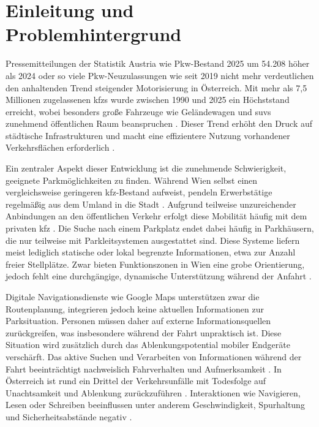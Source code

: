 \section{Einleitung und Problemhintergrund}

Pressemitteilungen der Statistik Austria wie \glqq Pkw-Bestand 2025 um 54.208 höher als 2024\grqq{} \parencite[S. 1]{statistikaustriaPkwBestand2025Um2026} oder  so viele Pkw-Neuzulassungen wie seit 2019 nicht mehr\grqq{} \parencite[S. 1]{statistikaustria2025VielePkwNeuzulassungen2026} verdeutlichen den anhaltenden Trend steigender Motorisierung in Österreich.
Mit mehr als 7,5 Millionen zugelassenen \acp{kfz} wurde zwischen 1990 und 2025 ein Höchststand erreicht, wobei besonders große Fahrzeuge wie Geländewagen und \acp{suv} zunehmend öffentlichen Raum beanspruchen \parencite{hatzlDatenZeigenImmer2025}.
Dieser Trend erhöht den Druck auf städtische Infrastrukturen und macht eine effizientere Nutzung vorhandener Verkehrsflächen erforderlich \parencite{jaschinskyWarumOsterreichsStadte2025}.

Ein zentraler Aspekt dieser Entwicklung ist die zunehmende Schwierigkeit, geeignete Parkmöglichkeiten zu finden.
Während Wien selbst einen vergleichsweise geringeren \acs{kfz}-Bestand aufweist, pendeln Erwerbstätige regelmäßig aus dem Umland in die Stadt \parencite{statistikaustriaKfzBestand2026}.
Aufgrund teilweise unzureichender Anbindungen an den öffentlichen Verkehr erfolgt diese Mobilität häufig mit dem privaten \acs{kfz} \parencite{aknoAKNiederosterreichPendleranalyse20252025}. Die Suche nach einem Parkplatz endet dabei häufig in Parkhäusern, die nur teilweise mit Parkleitsystemen ausgestattet sind.
Diese Systeme liefern meist lediglich statische oder lokal begrenzte Informationen, etwa zur Anzahl freier Stellplätze.
Zwar bieten Funktionszonen in Wien eine grobe Orientierung, jedoch fehlt eine durchgängige, dynamische Unterstützung während der Anfahrt \parencite{stadtwienParkleitsystemFuerWien2026}.

Digitale Navigationsdienste wie Google Maps unterstützen zwar die Routenplanung, integrieren jedoch keine aktuellen Informationen zur Parksituation.
Personen müssen daher auf externe Informationsquellen zurückgreifen, was insbesondere während der Fahrt unpraktisch ist.
Diese Situation wird zusätzlich durch das Ablenkungspotential mobiler Endgeräte verschärft.
Das aktive Suchen und Verarbeiten von Informationen während der Fahrt beeinträchtigt nachweislich Fahrverhalten und Aufmerksamkeit \parencite[S. 361]{oviedo-trespalaciosUnderstandingImpactsMobile2016}.
In Österreich ist rund ein Drittel der Verkehrsunfälle mit Todesfolge auf Unachtsamkeit und Ablenkung zurückzuführen \parencite{bmi397VerkehrstoteAuf2026}.
Interaktionen wie Navigieren, Lesen oder Schreiben beeinflussen unter anderem Geschwindigkeit, Spurhaltung und Sicherheitsabstände negativ \parencite[S. 372-373]{oviedo-trespalaciosUnderstandingImpactsMobile2016}.


